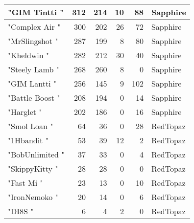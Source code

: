\documentclass{article}
\begin{document}
\begin{table}[htbp]
\begin{tabular}{|l|r|r|r|r|l|}
"GIM Tintti " & 312 & 214 & 10 & 88 & Sapphire \\ \hline
"Complex Air " & 300 & 202 & 26 & 72 & Sapphire \\ \hline
"MrSlingshot " & 287 & 199 & 8 & 80 & Sapphire \\ \hline
"Kheldwin " & 282 & 212 & 30 & 40 & Sapphire \\ \hline
"Steely Lamb " & 268 & 260 & 8 & 0 & Sapphire \\ \hline
"GIM Lantti " & 256 & 145 & 9 & 102 & Sapphire \\ \hline
"Battle Boost " & 208 & 194 & 0 & 14 & Sapphire \\ \hline
"Harglet " & 202 & 186 & 0 & 16 & Sapphire \\ \hline
"Smol Loan " & 64 & 36 & 0 & 28 & RedTopaz \\ \hline
"1Hbandit " & 53 & 39 & 12 & 2 & RedTopaz \\ \hline
"BobUnlimited " & 37 & 33 & 0 & 4 & RedTopaz \\ \hline
"SkippyKitty " & 28 & 28 & 0 & 0 & RedTopaz \\ \hline
"Fast Mi " & 23 & 13 & 0 & 10 & RedTopaz \\ \hline
"IronNemoko " & 20 & 14 & 0 & 6 & RedTopaz \\ \hline
"DI8S " & 6 & 4 & 2 & 0 & RedTopaz \\ \hline
\end{tabular}
\end{table}
\end{document}
